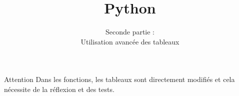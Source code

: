 \documentclass[9pt]{beamer}
\begin{document}
\begin{frame}
\begin{alertblock}{Attention}
Dans les fonctions, les tableaux sont directement modifiés et cela nécessite de la réflexion et des tests.
\end{alertblock}

\end{frame}

%
%

\title{Python}
\subtitle{Seconde partie :\\\medskip Utilisation avancée des tableaux}
\author{}
\institute{}
\date{}

\frame{\titlepage}
\end{document}
